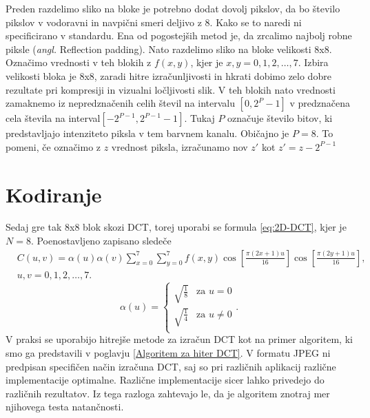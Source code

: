 \documentclass[a4paper,12pt,openright]{book}
\begin{document}
Preden razdelimo sliko na bloke je potrebno dodat dovolj pikslov, da bo število pikslov v vodoravni in navpični smeri deljivo z 8. Kako se to naredi ni specificirano v standardu. Ena od pogostejših metod je, da zrcalimo najbolj robne piksle (\textit{angl.} Reflection padding). Nato razdelimo sliko na bloke velikosti 8x8. Označimo vrednosti v teh blokih z $f(x,y)$, kjer je $x,y = 0,1,2,\ldots,7$. Izbira velikosti bloka je 8x8, zaradi hitre izračunljivosti in hkrati dobimo zelo dobre rezultate pri kompresiji in vizualni ločljivosti slik. V teh blokih nato vrednosti zamaknemo iz nepredznačenih celih števil na intervalu $\left[0,2^P-1\right]$ v predznačena cela števila na interval$\left[-2^{P-1},2^{P-1}-1\right]$. Tukaj $P$ označuje število bitov, ki predstavljajo intenziteto piksla v tem barvnem kanalu. Običajno je $P=8$. To pomeni, če označimo z $z$ vrednost piksla, izračunamo nov $z'$ kot $z' = z - 2^{P-1}$

\section{Kodiranje}

Sedaj gre tak 8x8 blok skozi DCT, torej uporabi se formula \eqref{eq:2D-DCT}, kjer je $N=8$. Poenostavljeno zapisano sledeče
\begin{equation}
    \begin{aligned}
    &C(u,v) = \alpha(u) \alpha(v) \sum_{x=0}^{7}\sum_{y=0}^{7} f(x,y)
    \cos\left[\frac{\pi(2x+1)u}{16}\right]
    \cos\left[\frac{\pi(2y+1)u}{16}\right], \\
    &u,v = 0,1,2,\ldots,7.
    \end{aligned}
\label{eq:2D-DCT_JPEG}
\end{equation}
\begin{equation}
\alpha(u)=
    \begin{cases}
          \sqrt{\frac{1}{8}} & \text{za $u=0$} \\
          \sqrt{\frac{1}{4}} & \text{za $u\neq 0$} \\
    \end{cases}.
\label{eq:definicija_alpha_JPEG}
\end{equation}
V praksi se uporabijo hitrejše metode za izračun DCT kot na primer algoritem, ki smo ga predstavili v poglavju \ref{Algoritem za hiter DCT}. V formatu JPEG ni predpisan specifičen način izračuna DCT, saj so pri različnih aplikacij različne implementacije optimalne. Različne implementacije sicer lahko privedejo do različnih rezultatov. Iz tega razloga zahtevajo le, da je algoritem znotraj mer njihovega testa natančnosti. \par
\end{document}
